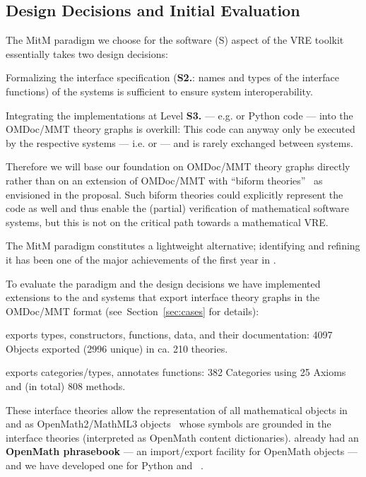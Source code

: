 \subsection{Design Decisions and Initial Evaluation}
The MitM paradigm we choose for the software (S) aspect of the \pn VRE toolkit essentially
takes two design decisions:
\begin{compactenum}[\bf D1.]
\item Formalizing the interface specification (\textbf{S2.}: names and
  types of the interface functions) of the systems is sufficient to ensure system
  interoperability.
\item Integrating the implementations at Level \textbf{S3.} --- e.g. \GAP or Python code --- into
  the OMDoc/MMT theory graphs is overkill:
  This code can anyway only be executed by the respective systems --- i.e. \GAP or \SageMath --- and is rarely exchanged between systems.
\end{compactenum}
Therefore we will base our foundation on OMDoc/MMT theory graphs directly rather than on an extension of OMDoc/MMT with
  ``biform theories''~\cite{KohManRab:aumftg13,Farmer:btc07} as envisioned in the
  proposal. Such biform theories could explicitly represent the code as well and thus enable the (partial) verification of mathematical software
  systems, but this is not on the critical path towards a mathematical VRE.

The MitM paradigm constitutes a lightweight alternative; identifying and refining it has
been one of the major achievements of the first year in .

To evaluate the paradigm and the design decisions we have implemented extensions to the
\GAP and \SageMath systems that export interface theory graphs in the OMDoc/MMT format
(see~Section~\ref{sec:cases} for details):
\begin{compactitem}
\item \GAP exports types, constructors, functions, data, and their documentation: 4097
  Objects exported (2996 unique) in ca. 210 theories.
\item \SageMath exports categories/types, annotates functions: 382 Categories using 25
  Axioms and (in total) 808 methods.
\end{compactitem}
These interface theories allow the representation of all mathematical objects in \GAP and
\SageMath as OpenMath2/MathML3 objects~\cite{BusCapCar:2oms03,CarlisleEd:MathML3} whose
symbols are grounded in the interface theories (interpreted as OpenMath content
dictionaries). \GAP already had an \textbf{OpenMath phrasebook} --- an import/export
facility for OpenMath objects --- and we have developed one for Python and
\SageMath~\cite{py-openmath:on}.

